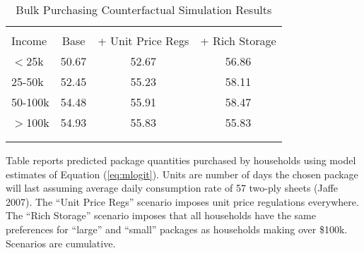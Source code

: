 \begin{table}[!htbp] \centering
\caption{Bulk Purchasing Counterfactual Simulation Results}
\label{tab:counterfactualMNLDays}
\begin{tabular}{lccc}
\\[-1.8ex]\hline
\hline \\[-1.8ex]
Income   & Base    & + Unit Price Regs   &  + Rich Storage  \\
\hline
$<$25k     & 50.67   & 52.67              & 56.86 \\
25-50k   & 52.45   & 55.23              & 58.11 \\
50-100k  & 54.48   & 55.91              & 58.47 \\
$>$100k    & 54.93   & 55.83              & 55.83 \\
\\[-1.8ex]\hline
\hline \\[-1.8ex]
\end{tabular}
\begin{tablenotes}
Table reports predicted package quantities purchased by households using model estimates of Equation (\ref{eq:mlogit}). Units are number of days the chosen package will last assuming average daily consumption rate of 57 two-ply sheets (Jaffe 2007). The ``Unit Price Regs'' scenario imposes unit price regulations everywhere. The ``Rich Storage'' scenario imposes that all households have the same preferences for ``large'' and ``small'' packages as households making over \$100k. Scenarios are cumulative.
\end{tablenotes}
\end{table}
